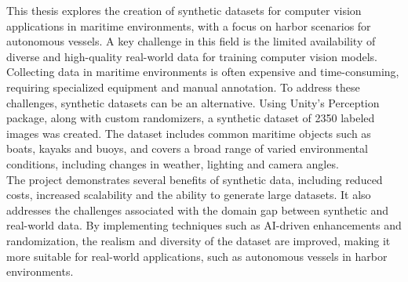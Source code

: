 
This thesis explores the creation of synthetic datasets for computer vision applications in maritime environments, with a focus on harbor scenarios for autonomous vessels. A key challenge in this field is the limited availability of diverse and high-quality real-world data for training computer vision models. Collecting data in maritime environments is often expensive and time-consuming, requiring specialized equipment and manual annotation. To address these challenges, synthetic datasets can be an alternative. Using Unity’s Perception package, along with custom randomizers, a synthetic dataset of 2350 labeled images was created. The dataset includes common maritime objects such as boats, kayaks and buoys, and covers a broad range of varied environmental conditions, including changes in weather, lighting and camera angles.\\

\noindent The project demonstrates several benefits of synthetic data, including reduced costs, increased scalability and the ability to generate large datasets. It also addresses the challenges associated with the domain gap between synthetic and real-world data. By implementing techniques such as AI-driven enhancements and randomization, the realism and diversity of the dataset are improved, making it more suitable for real-world applications, such as autonomous vessels in harbor environments.
